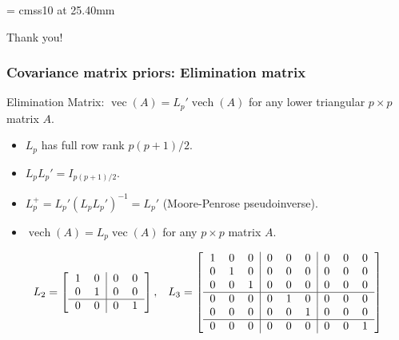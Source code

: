 \documentclass[xcolor=dvipsnames]{beamer}
\DeclareMathOperator{\vech}{vech}
\DeclareMathOperator{\vect}{vec}
\begin{document}
\appendix
{}
\setcounter{finalframe}{\value{framenumber}}

\begin{frame}

      \begin{center}

        \font\endfont = cmss10 at 25.40mm
        \color{Red}
        \endfont 
        \baselineskip 20.0mm

        Thank you!

      \end{center}    


\end{frame}

\begin{frame}
\frametitle{Covariance matrix priors: Elimination matrix}
Elimination Matrix: $\vect(A)=L_p'\vech(A)$ for any lower triangular $p\times p$ matrix $A$.
\begin{itemize}
\item $L_p$ has full row rank $p(p+1)/2$.
\item $L_pL_p'=I_{p(p+1)/2}$.
\item $L_p^{+}=L_p'(L_pL_p')^{-1}=L_p'$ (Moore-Penrose pseudoinverse).
\item $\vech(A)=L_p\vect(A)$ for any $p\times p$ matrix $A$.
\end{itemize}
\pause\begin{align*}
L_2 = \left[\begin{tabular}{cc|cc} 1 & 0 & 0 & 0 \\ 0 & 1 & 0 & 0 \\\hline 0 & 0 & 0 & 1 \end{tabular}\right], && L_3 =  \left[\begin{tabular}{ccc|ccc|ccc}
1 & 0 & 0 & 0 & 0 & 0 & 0 & 0 & 0  \\ 
0 & 1 & 0 & 0 & 0 & 0 & 0 & 0 & 0 \\ 
0 & 0 & 1 & 0 & 0 & 0 & 0 & 0 & 0 \\\hline
0 & 0 & 0 & 0 & 1 & 0 & 0 & 0 & 0 \\
0 & 0 & 0 & 0 & 0 & 1 & 0 & 0 & 0 \\\hline
0 & 0 & 0 & 0 & 0 & 0 & 0 & 0 & 1 \\
\end{tabular}\right]\\~\\
\end{align*}
\end{frame}
\end{document}

